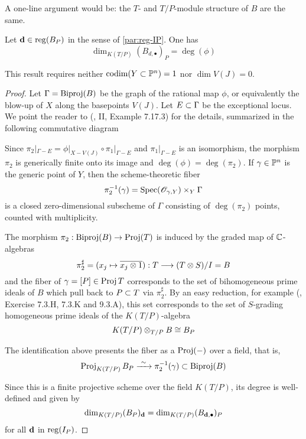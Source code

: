 \documentclass[fleqn,reqno]{amsart}
\numberwithin{first}{chapter}
\begin{document}
\begin{remarkhint}
A one-line argument would be: the $T$- and $T/P$-module structure of $B$ are the same.
\end{remarkhint}

\begin{lemma}
\label{lemma:lengthRees}
Let $\mathbf d\in \operatorname{reg}(B_P)$ in the sense of \eqref{par:reg-IP}. One has
\[
	\dim_{K(T/P)} (B_{d,\bullet})_P=\deg(\phi)
\]
\end{lemma}

\begin{remarkhint}
This result requires neither $\operatorname{codim}(Y\subset\mathbb{P}^n)=1$ nor $\dim V(J)=0$.
\end{remarkhint}

\begin{proof}
Let $\Gamma=\operatorname{Biproj}(B)$ be the graph of the rational map $\phi$, or equivalently
the blow-up of $X$ along the basepoints $V(J)$. Let $E\subset\Gamma$ be the exceptional
locus.
We point the reader to (\citet{Har77}, II, Example 7.17.3) for the details,
summarized in the following commutative diagram


Since $\pi_2|_{\Gamma-E}=\phi|_{X-V(J)}\circ\pi_1|_{\Gamma-E}$ and
$\pi_1|_{\Gamma-E}$ is an isomorphism,
the morphism $\pi_2$ is generically finite onto its image and $\deg(\phi)=\deg(\pi_2)$.
If $\gamma\in\mathbb{P}^n$ is the generic point of $Y$, then the scheme-theoretic fiber
\[
	\pi_2^{-1}(\gamma)=\operatorname{Spec}(\mathscr{O}_{\gamma,Y})\times_Y \Gamma
\]
is a closed zero-dimensional subscheme of $\Gamma$ consisting of
$\deg(\pi_2)$ points, counted with multiplicity.

The morphism $\pi_2:\operatorname{Biproj}(B)\to\operatorname{Proj}(T)$ is induced by the graded map of $\mathbb{C}$-algebras
\[
	\pi_2^\sharp=(x_j\mapsto \overline{x_j\otimes1}):T\longrightarrow{(T\otimes S)}/{I}=B
\]
and the fiber of $\gamma=[P]\in\operatorname{Proj} T$ corresponds to the set of bihomogeneous prime ideals of $B$
which pull back to $P\subset T$ via $\pi_2^\sharp$.
By an easy reduction,
for example (\citet{Vakil10}, Exercise 7.3.H, 7.3.K and 9.3.A),
this set corresponds to the set of $S$-grading homogeneous prime ideals of the $K(T/P)$-algebra
\[
	K(T/P)\otimes_{T/P}B\cong B_P
\]

The identification above presents the fiber as a $\operatorname{Proj}(-)$ over a field,
that is,
\[
	\operatorname{Proj}_{K(T/P)} B_P\xrightarrow{~\sim~}\pi_2^{-1}(\gamma)\subset\operatorname{Biproj}(B)
\]

Since this is a finite projective scheme over the field $K(T/P)$,
its degree is well-defined and given by
\[
	\dim_{K(T/P)} (B_P)_\mathbf d=\dim_{K(T/P)} (B_{\mathbf d,\bullet})_P
\]
for all $\mathbf d$ in $\operatorname{reg}(I_P)$.
\end{proof}
\end{document}
